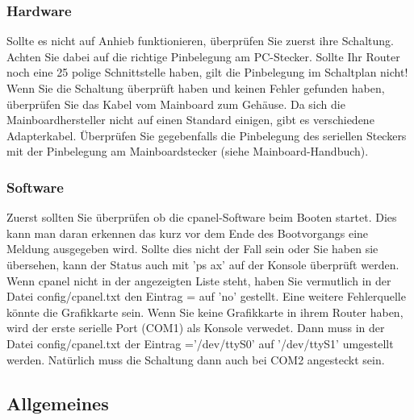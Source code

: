 \subsubsection{Hardware}

Sollte es nicht auf Anhieb funktionieren, überprüfen Sie zuerst ihre Schaltung.
Achten Sie dabei auf die richtige Pinbelegung am PC-Stecker. Sollte Ihr Router noch eine
25 polige Schnittstelle haben, gilt die Pinbelegung im Schaltplan nicht!
Wenn Sie die Schaltung überprüft haben und keinen Fehler gefunden haben, überprüfen Sie
das Kabel vom Mainboard zum Gehäuse. Da sich die Mainboardhersteller nicht auf einen
Standard einigen, gibt es verschiedene Adapterkabel. Überprüfen Sie gegebenfalls die
Pinbelegung des seriellen Steckers mit der Pinbelegung am Mainboardstecker
(siehe Mainboard-Handbuch).

\subsubsection{Software}

Zuerst sollten Sie überprüfen ob die cpanel-Software beim Booten startet. Dies kann man
daran erkennen das kurz vor dem Ende des Bootvorgangs eine Meldung ausgegeben wird. Sollte
dies nicht der Fall sein oder Sie haben sie übersehen, kann der Status auch mit 'ps ax'
auf der Konsole überprüft werden. Wenn cpanel nicht in der angezeigten Liste steht,
haben Sie vermutlich in der Datei config/cpanel.txt den Eintrag = auf 'no'
gestellt.
Eine weitere Fehlerquelle könnte die Grafikkarte sein. Wenn Sie keine Grafikkarte in
ihrem Router haben, wird der erste serielle Port (COM1) als Konsole verwedet. Dann muss
in der Datei config/cpanel.txt der Eintrag ='/dev/ttyS0' auf '/dev/ttyS1'
umgestellt werden. Natürlich muss die Schaltung dann auch bei COM2 angesteckt sein.


\subsection{Allgemeines}

